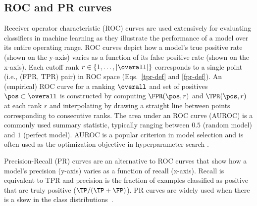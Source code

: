 \subsection{ROC and PR curves} \label{roc}
Receiver operator characteristic (ROC) curves are used extensively for evaluating classifiers in machine learning \citep{Bradley:1997:UAU:1746432.1746434} as they illustrate the performance of a model over its entire operating range. ROC curves depict how a model's true positive rate (shown on the y-axis) varies as a function of its false positive rate (shown on the x-axis). Each cutoff rank $r \in \{1,\ldots,|\overall|\}$ corresponds to a single point (i.e., (FPR, TPR) pair) in ROC space (Eqs.~\eqref{tpr-def} and \eqref{fpr-def}). An (empirical) ROC curve for a ranking $\overall$ and set of positives $\pos \subset \overall$ is constructed by computing $\FPR(\pos, r)$ and $\TPR(\pos, r)$ at each rank $r$ and interpolating by drawing a straight line between points corresponding to consecutive ranks.  
The area under an ROC curve (AUROC) is a commonly used summary statistic, typically ranging between $0.5$ (random model) and $1$ (perfect model). AUROC is a popular  criterion in model selection and is often used as the optimization objective in hyperparameter search \citep{Bradley:1997:UAU:1746432.1746434}.




Precision-Recall (PR) curves  \citep{Davis:2006:RPR:1143844.1143874} are an alternative to ROC curves that show how a model's precision (y-axis) varies as a function of recall (x-axis). Recall is equivalent to TPR and precision is the fraction of examples classified as
positive that are truly positive ($\TP / (\TP+\FP)$). PR curves are widely used when there is a skew in the class distributions~\cite{davis-icml09,Claesen2015resvm}.



